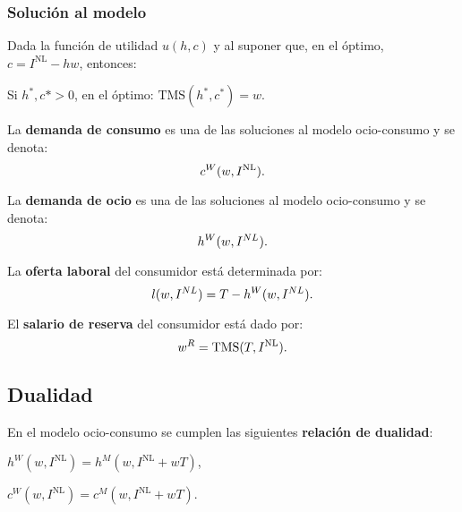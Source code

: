 \documentclass[8pt,a4paper]{extarticle}
\begin{document}
\begin{multicols}{3}
	\subsubsection*{Solución al modelo}

	Dada la función de utilidad $u (h, c)$ y al suponer que, en el óptimo, $c = I^{\text{NL}} - hw$, entonces:

	\begin{bulletlist}
		\item Si $h^*, c* > 0$, en el óptimo: $\text{TMS} (h^*, c^*) = w$.
	\end{bulletlist}

	\begin{boxdef}
		La \textbf{demanda de consumo} es una de las soluciones al modelo ocio-consumo y se denota:
		\[
			c^W(w, I^{\text{\normalfont NL}})
			.\]
	\end{boxdef}

	\begin{boxdef}
		La \textbf{demanda de ocio} es una de las soluciones al modelo ocio-consumo y se denota:
		\[
			h^W(w, I^{\normalfont NL})
			.\]
	\end{boxdef}

	\begin{boxdef}
		La \textbf{oferta laboral} del consumidor está determinada por:
		\[
			l(w, I^{\normalfont NL}) = T - h^W(w, I^{\normalfont NL})
			.\]
	\end{boxdef}

	\begin{boxdef}
		El \textbf{salario de reserva} del consumidor está dado por:
		\[
			w^R = \text{\normalfont TMS} (T, I^{\text{\normalfont NL}})
			.\]
	\end{boxdef}

	\sectionbreak

	\subsection{Dualidad}

	En el modelo ocio-consumo se cumplen las siguientes \textbf{relación de dualidad}:

	\begin{eqlist}
		\item $h^W(w, I^{\text{NL}}) = h^M (w, I^{\text{NL}} + wT)$,
		\item $c^W(w, I^{\text{NL}}) = c^M (w, I^{\text{NL}} + wT)$.
	\end{eqlist}


\end{multicols}
\end{document}
